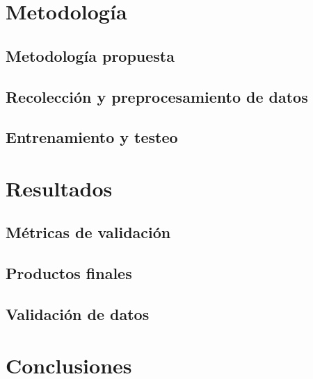 \documentclass{beamer}
\begin{document}
  \section{Metodología}
  \subsection*{Metodología propuesta}

  \begin{frame}
    \frametitle{}
  \end{frame}

  \subsection*{Recolección y preprocesamiento de datos}

  \begin{frame}
    \frametitle{}
  \end{frame}

  \subsection*{Entrenamiento y testeo}

  \begin{frame}
    \frametitle{}
  \end{frame}

  \section{Resultados}

  \subsection*{Métricas de validación}

  \begin{frame}
    \frametitle{}
  \end{frame}

  \subsection*{Productos finales}

  \begin{frame}
    \frametitle{}
  \end{frame}

  \subsection*{Validación de datos}

  \begin{frame}
    \frametitle{}
  \end{frame}

  \section{Conclusiones}

  \begin{frame}
    \frametitle{}
  \end{frame}
\end{document}
